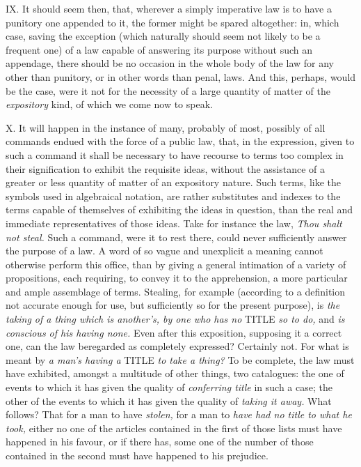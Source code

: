 \documentclass[12pt]{report}
\begin{document}
IX. It should seem then, that, wherever a simply imperative law is to
have a punitory one appended to it, the former might be spared
altogether: in, which case, saving the exception (which naturally should
seem not likely to be a frequent one) of a law capable of answering its
purpose without such an appendage, there should be no occasion in the
whole body of the law for any other than punitory, or in other words
than penal, laws. And this, perhaps, would be the case, were it not for
the necessity of a large quantity of matter of the \emph{expository}
kind, of which we come now to speak.

X. It will happen in the instance of many, probably of most, possibly of
all commands endued with the force of a public law, that, in the
expression, given to such a command it shall be necessary to have
recourse to terms too complex in their signification to exhibit the
requisite ideas, without the assistance of a greater or less quantity of
matter of an expository nature. Such terms, like the symbols used in
algebraical notation, are rather substitutes and indexes to the terms
capable of themselves of exhibiting the ideas in question, than the real
and immediate representatives of those ideas. Take for instance the law,
\emph{Thou shalt not steal.} Such a command, were it to rest there,
could never sufficiently answer the purpose of a law. A word of so vague
and unexplicit a meaning cannot otherwise perform this office, than by
giving a general intimation of a variety of propositions, each
requiring, to convey it to the apprehension, a more particular and ample
assemblage of terms. Stealing, for example (according to a definition
not accurate enough for use, but sufficiently so for the present
purpose), is \emph{the taking of a thing which is another's, by one who
has no} TITLE \emph{so to do,} and \emph{is conscious of his having
none.} Even after this exposition, supposing it a correct one, can the
law beregarded as completely expressed? Certainly not. For what is meant
by \emph{a man's having a} TITLE \emph{to take a thing?} To be complete,
the law must have exhibited, amongst a multitude of other things, two
catalogues: the one of events to which it has given the quality of
\emph{conferring title} in such a case; the other of the events to which
it has given the quality of \emph{taking it away.} What follows? That
for a man to have \emph{stolen,} for a man to \emph{have had no title to
what he took,} either no one of the articles contained in the first of
those lists must have happened in his favour, or if there has, some one
of the number of those contained in the second must have happened to his
prejudice.
\end{document}
